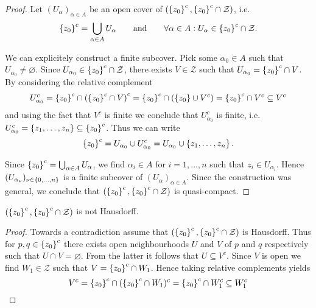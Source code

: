 \begin{enumerate}[label = \textbf{Exercise \arabic*.},wide = 0pt, itemsep=1.5ex]
\begin{enumerate}[label = (\roman*),wide = 10pt, itemsep=1.5ex]
		\begin{proof}
			Let $(U_\alpha)_{\alpha \in A}$ be an open cover of $(\cbr[0]{z_0}^c, \cbr[0]{z_0}^c \cap \mathcal{Z})$, i.e. 
				\begin{equation}
					\cbr[0]{z_0}^c = \bigcup_{\alpha \in A}U_\alpha \qquad \text{and} \qquad \forall \alpha \in A: U_\alpha \in \cbr[0]{z_0}^c \cap \mathcal{Z}.
				\end{equation}

				We can explicitely construct a finite subcover. Pick some $\alpha_0 \in A$ such that $U_{\alpha_0} \ne \varnothing$. Since $U_{\alpha_0} \in \cbr[0]{z_0}^c \cap \mathcal{Z}$, there exists $V \in \mathcal{Z}$ such that $U_{\alpha_0} = \cbr[0]{z_0}^c \cap V$. By considering the relative complement
				\begin{equation}
					U_{\alpha_0}^c = \cbr[0]{z_0}^c \cap \del[0]{\cbr[0]{z_0}^c \cap V}^c = \cbr[0]{z_0}^c \cap (\cbr[0]{z_0} \cup V^c) = \cbr[0]{z_0}^c \cap V^c \subseteq V^c
				\end{equation}
				\noindent and using the fact that $V^c$ is finite we conclude that $U_{\alpha_0}^c$ is finite, i.e. $U_{\alpha_0}^c = \cbr[0]{z_1,\dots,z_n} \subseteq \cbr[0]{z_0}^c$. Thus we can write 
		\begin{equation}
			\cbr[0]{z_0}^c = U_{\alpha_0} \cup U_{\alpha_0}^c = U_{\alpha_0} \cup \cbr[0]{z_1,\dots,z_n}.
		\end{equation}

		Since $\cbr[0]{z_0}^c = \bigcup_{\alpha \in A}U_\alpha$, we find $\alpha_i \in A$ for $i = 1,\dots,n$ such that $z_i \in U_{\alpha_i}$. Hence $(U_{\alpha_\nu})_{\nu \in \cbr[0]{0,\dots,n}}$ is a finite subcover of $(U_\alpha)_{\alpha \in A}$. Since the construction was general, we conclude that $(\cbr[0]{z_0}^c, \cbr[0]{z_0}^c \cap \mathcal{Z})$ is quasi-compact. 
	\end{proof}

		\begin{lemma}
			$(\cbr[0]{z_0}^c, \cbr[0]{z_0}^c \cap \mathcal{Z})$ is not Hausdorff.
			\label{lem:z_0_not_haus}
		\end{lemma}

		\begin{proof}
			Towards a contradiction assume that $(\cbr[0]{z_0}^c, \cbr[0]{z_0}^c \cap \mathcal{Z})$ is Hausdorff. Thus for $p,q \in \cbr[0]{z_0}^c$ there exists open neighbourhoods $U$ and $V$ of $p$ and $q$ respectively such that $U \cap V = \varnothing$. From the latter it follows that $U \subseteq V^c$. Since $V$ is open we find $W_1 \in \mathcal{Z}$ such that $V = \cbr[0]{z_0}^c \cap W_1$. Hence taking relative complements yields 
			\begin{equation*}
				V^c = \cbr[0]{z_0}^c \cap (\cbr[0]{z_0}^c \cap W_1)^c = \cbr[0]{z_0}^c \cap W_1^c \subseteq W_1^c
			\end{equation*}


\end{proof}
\end{enumerate}
\end{enumerate}
